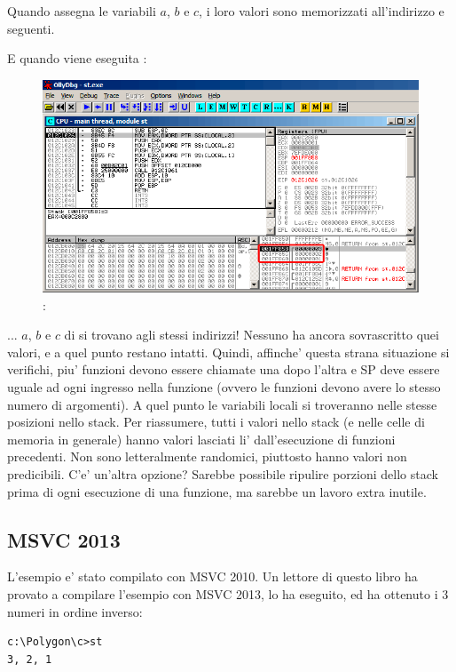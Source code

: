 Quando  assegna le variabili $a$, $b$ e $c$, i loro valori sono memorizzati all'indirizzo  e seguenti.

\clearpage
E quando viene eseguita :

\begin{figure}[H]
\centering
\includegraphics[scale=\FigScale]{patterns/02_stack/08_noise/olly2.png}
\caption{\olly: }
\label{fig:stack_noise_olly2}
\end{figure}

... $a$, $b$ e $c$ di  si trovano agli stessi indirizzi!
Nessuno ha ancora sovrascritto quei valori, e a quel punto restano intatti.
Quindi, affinche' questa strana situazione si verifichi, piu' funzioni devono essere chiamate una dopo l'altra e
\ac{SP} deve essere uguale ad ogni ingresso nella funzione (ovvero le funzioni devono avere lo stesso numero di argomenti).
A quel punto le variabili locali si troveranno nelle stesse posizioni nello stack.
Per riassumere, tutti i valori nello stack (e nelle celle di memoria in generale) hanno valori lasciati li' dall'esecuzione di funzioni precedenti.
Non sono letteralmente randomici, piuttosto hanno valori non predicibili.
C'e' un'altra opzione?
Sarebbe possibile ripulire porzioni dello stack prima di ogni esecuzione di una funzione, ma sarebbe un lavoro extra inutile.

\subsection{MSVC 2013}

L'esempio e' stato compilato con MSVC 2010.
Un lettore di questo libro ha provato a compilare l'esempio con MSVC 2013, lo ha eseguito, ed ha ottenuto i 3 numeri in ordine inverso:%

\begin{lstlisting}
c:\Polygon\c>st
3, 2, 1
\end{lstlisting}

